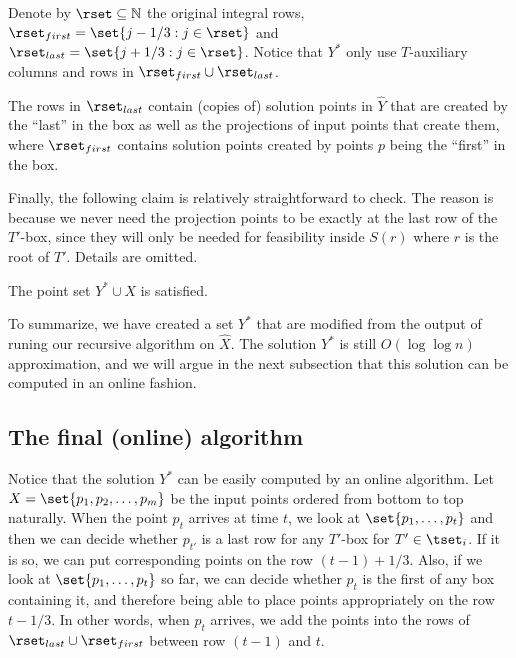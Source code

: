 Denote by $\rset \subseteq {\mathbb N}$ the original integral rows, $\rset_{first}=\set{j - 1/3: j \in \rset}$ and $\rset_{last} = \set{j + 1/3: j \in \rset}$.
Notice that $Y^*$ only use $T$-auxiliary columns and rows in $\rset_{first} \cup \rset_{last}$.

\begin{observation}
The rows in $\rset_{last}$ contain (copies of) solution points in $\hat{Y}$ that are created by the ``last'' in the box as well as the projections of input points that create them, where $\rset_{first}$ contains solution points created by points $p$ being the ``first'' in the box.  
\end{observation}  

Finally, the following claim is relatively straightforward to check. The reason is because we never need the projection points to be exactly at the last row of the $T'$-box, since they will only be needed for feasibility inside $S(r)$ where $r$ is the root of $T'$. 
Details are omitted. 

\begin{claim}
The point set $Y^* \cup X$ is satisfied. 
\end{claim}  

To summarize, we have created a set $Y^*$ that are modified from the output of runing our recursive algorithm on $\hat{X}$. 
The solution $Y^*$ is still $O(\log \log n)$ approximation, and we will argue in the next subsection that this solution can be computed in an online fashion.  
   

\subsection{The final (online) algorithm}  
\label{subsec: online alg}

Notice that the solution $Y^*$ can be easily computed by an online algorithm. Let $X= \set{p_1,p_2,\ldots, p_m}$ be the input points ordered from bottom to top naturally.  
When the point $p_t$ arrives at time $t$, we look at $\set{p_1,\ldots, p_t}$ and then we can decide whether $p_{t'}$ is a last row for any $T'$-box for $T' \in \tset_i$. 
If it is so, we can put corresponding points on the row $(t-1) + 1/3$. 
Also, if we look at $\set{p_1,\ldots, p_t}$ so far, we can decide whether $p_t$ is the first of any box containing it, and therefore being able to place points appropriately on the row $t - 1/3$.  
In other words, when $p_t$ arrives, we add the points into the rows of $\rset_{last} \cup \rset_{first}$ between row $(t-1)$ and $t$.    
 
